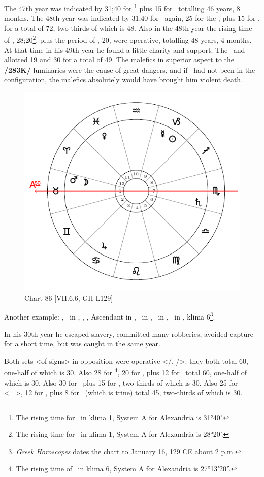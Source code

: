 The 47th year was indicated by 31;40 for \Cancer\footnote{The rising time for \Cancer\, in klima 1, System A for Alexandria is 31°40'.} plus 15 for
\Mars\, totalling 46 years, 8 months. The 48th year was indicated by 31;40 for \Cancer\, again, 25 for the \Moon, plus 15 for \Mars, for a total of 72, two-thirds of which is 48. Also in the 48th year the rising time of \Gemini, 28;20\footnote{The rising time for \Gemini\, in klima 1, System A for Alexandria is 28°20'.}, plus the period of \Mercury, 20, were operative, totalling 48 years, 4 months. At that time in his 49th year he found a little charity and support. The \Sun\, and \Saturn\, allotted 19 and 30 for a total of 49. The malefics in superior aspect to the \textbf{/283K/} luminaries were the cause of great dangers, and if \Jupiter\, had not been in the configuration, the malefics absolutely would have brought him violent death. 

\newpage
\begin{figure}
\centering
\includegraphics[width=.68\textwidth]{charts/7_6_06}
\caption{Chart 86 [VII.6.6, GH L129]}
\label{fig:chart86}
\end{figure} 

Another example: \Sun, \Mercury\, in \Capricorn, \Moon, \Mars, Ascendant in \Taurus, \Saturn\, in \Scorpio, \Jupiter\, in \Cancer, \Venus\, in \Pisces, klima 6\footnote{\textit{Greek Horoscopes} dates the chart to January 16, 129 CE about 2 p.m.}.

In his 30th year he escaped slavery, committed many robberies, avoided capture for a short time, but was caught in the same year. 

Both sets <of signs> in opposition were operative <\Taurus/\Scorpio, \Cancer/\Capricorn>: they both total 60, one-half of which is 30. Also 28 for \Capricorn\footnote{The rising time of \Capricorn\, in klima 6, System A for Alexandria is 27°13'20''.}, 20 for \Mercury, plus 12 for \Jupiter\, total 60, one-half of which is 30. Also 30 for \Saturn\, plus 15 for \Mars, two-thirds of which is 30. Also 25 for \Cancer\, <=\Moon>, 12 for \Jupiter, plus
8 for \Venus\, (which is trine) total 45, two-thirds of which is 30. 


